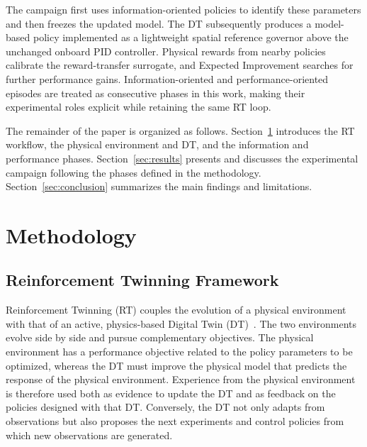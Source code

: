 \documentclass[journal]{IEEEtran}
\begin{document}
The campaign first uses information-oriented policies to identify these parameters and then freezes the updated model. The DT subsequently produces a model-based policy implemented as a lightweight spatial reference governor above the unchanged onboard PID controller. Physical rewards from nearby policies calibrate the reward-transfer surrogate, and Expected Improvement searches for further performance gains. Information-oriented and performance-oriented episodes are treated as consecutive phases in this work, making their experimental roles explicit while retaining the same RT loop.

The remainder of the paper is organized as follows. Section~\ref{sec:methodology} introduces the RT workflow, the physical environment and DT, and the information and performance phases. Section~\ref{sec:results} presents and discusses the experimental campaign following the phases defined in the methodology. Section~\ref{sec:conclusion} summarizes the main findings and limitations.

\section{Methodology}\label{sec:methodology}


\subsection{Reinforcement Twinning Framework}
\label{sec:rt-framework}

Reinforcement Twinning (RT) couples the evolution of a physical environment with that of an active, physics-based Digital Twin (DT)~\cite{SchenaRT2023,Mendez2026}. The two environments evolve side by side and pursue complementary objectives. The physical environment has a performance objective related to the policy parameters to be optimized, whereas the DT must improve the physical model that predicts the response of the physical environment. Experience from the physical environment is therefore used both as evidence to update the DT and as feedback on the policies designed with that DT. Conversely, the DT not only adapts from observations but also proposes the next experiments and control policies from which new observations are generated.
\end{document}
